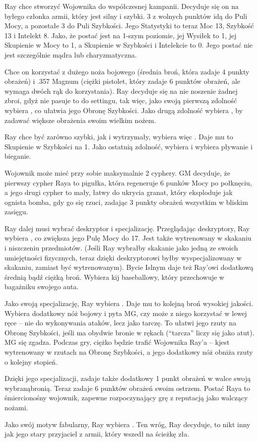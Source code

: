 Ray chce stworzyć Wojownika do współczesnej kampanii. Decyduje się on na byłego członka armii, który jest silny i szybki. 3 z wolnych punktów idą do Puli Mocy, a pozostałe 3 do Puli Szybkości. Jego Statystyki to teraz Moc 13, Szybkość 13 i Intelekt 8. Jako, że postać jest na 1-szym  poziomie, jej Wysiłek to 1, jej Skupienie w Mocy to 1, a Skupienie w Szybkości i Intelekcie to 0. Jego postać nie jest szczególnie mądra lub charyzmatyczna.

Chce on korzystać z dużego noża bojowego (średnia broń, która zadaje 4 punkty obrażeń) i .357 Magnum (ciężki pistolet, który zadaje 6 punktów obrażeń, ale wymaga dwóch rąk do korzystania). Ray decyduje się na nie noszenie żadnej zbroi, gdyż nie pasuje to do settingu, tak więc, jako swoją pierwszą zdolność wybiera , co ułatwia jego Obronę Szybkości. Jako drugą zdolność wybiera , by zadawać większe obrażenia swoim wielkim nożem. 

Ray chce być zarówno szybki, jak i wytrzymały, wybiera więc . Daje mu to Skupienie w Szybkości na 1. Jako ostatnią zdolność, wybiera  i wybiera pływanie i bieganie. 

Wojownik może mieć przy sobie maksymalnie 2 cyphery. GM decyduje, że pierwszy cypher Raya to pigułka, która regeneruje 6 punków Mocy po połknęciu, a jego drugi cypher to mały, łatwy do ukrycia granat, który eksploduje jak ognista bomba, gdy go się rzuci, zadając 3 punkty obrażeń wszystkim w bliskim zasięgu. 

Ray dalej musi wybrać deskryptor i specjalizację. Przeglądając deskryptory, Ray wybiera , co zwiększa jego Pulę Mocy do 17. Jest także wytrenowany w skakaniu i niszczeniu przedmiotów. (Jeśli Ray wybrałby skakanie jako jedną ze swoich umiejętności fizycznych, teraz dzięki deskryptorowi byłby wyspecjalizowany w skakaniu, zamiast być wytrenowanym). Bycie Islnym daje też Ray’owi dodatkową średnią bądź ciężką broń. Wybiera kij baseballowy, który przechowuje w bagażniku swojego auta. 

Jako swoją specjalizację, Ray wybiera . Daje mu to kolejną broń wysokiej jakości. Wybiera dodatkowy nóż bojowy i pyta MG, czy może z niego korzystać w lewej ręce – nie do wykonywania ataków, lecz jako tarczę. To ułatwi jego rzuty na Obronę Szybkości, jeśli ma obydwie bronie w rękach (“tarcza” liczy się jako atut). MG się zgadza. Podczas gry, ciężko będzie trafić Wojownika Ray’a – kjest wytrenowany w rzutach na Obronę Szybkości, a jego dodatkowy nóż obniża rzuty o kolejny stopień. 

Dzięki jego specjalizacji, zadaje także dodatkowy 1 punkt obrażeń w walce swoją wybranąbronią. Teraz zadaje 6 punktów obrażeń swoim ostrzem. Postać Raya to śmiercionośny wojownik, zapewne rozpoczynający grę z reputacją jako walczący nożami. 

Jako swój motyw fabularny, Ray wybiera . Ten wróg, Ray decyduje, to nikt inny jak jego stary przyjaciel z armii, który wszedł na ścieżkę zła.